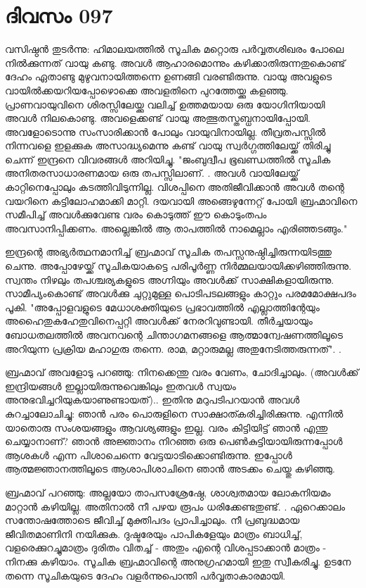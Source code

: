  
\section{ദിവസം 097}


വസിഷ്ഠന്‍ തുടര്‍ന്നു: ഹിമാലയത്തില്‍ സൂചിക മറ്റൊരു പര്‍വ്വതശിഖരം പോലെ നില്‍ക്കുന്നത്‌ വായു കണ്ടു. അവള്‍ ആഹാരമൊന്നും കഴിക്കാതിരുന്നതുകൊണ്ട്‌ ദേഹം ഏതാണ്ടു മുഴുവനായിത്തന്നെ ഉണങ്ങി വരണ്ടിരുന്നു. വായു അവളുടെ വായില്‍ക്കയറിയപ്പോഴൊക്കെ അവളതിനെ പുറത്തേയ്ക്കു കളഞ്ഞു. പ്രാണവായുവിനെ ശിരസ്സിലേയ്ക്കു വലിച്ച്‌ ഉത്തമയായ ഒരു യോഗിനിയായി അവള്‍ നിലകൊണ്ടു. അവളെക്കണ്ട്‌ വായു അത്ഭുതസ്തബ്ധനായിപ്പോയി. അവളോടൊന്നു സംസാരിക്കാന്‍ പോലും വായുവിനായില്ല. തീവ്രതപസ്സില്‍ നിന്നവളെ ഇളക്കുക അസാദ്ധ്യമെന്നു കണ്ട്‌ വായു സ്വര്‍ഗ്ഗത്തിലേയ്ക്ക്‌ തിരിച്ചു ചെന്ന് ഇന്ദ്രനെ വിവരങ്ങള്‍ അറിയിച്ചു. "ജംബുദ്വീപ ഭൂഖണ്ഡത്തില്‍ സൂചിക അനിതരസാധാരണമായ ഒരു തപസ്സിലാണ്‌. . അവള്‍ വായിലേയ്ക്ക്‌ കാറ്റിനെപ്പോലും കടത്തിവിടുന്നില്ല. വിശപ്പിനെ അതിജീവിക്കാന്‍ അവള്‍ തന്റെ വയറിനെ കട്ടിലോഹമാക്കി മാറ്റി. ദയവായി അങ്ങെഴുന്നേറ്റ്‌ പോയി ബ്രഹ്മാവിനെ സമീപിച്ച്‌ അവള്‍ക്കുവേണ്ട വരം കൊടുത്ത്‌ ഈ കൊടുംതപം അവസാനിപ്പിക്കണം. അല്ലെങ്കില്‍ ആ താപത്തില്‍ നാമെല്ലാം എരിഞ്ഞടങ്ങും." 

ഇന്ദ്രന്റെ അഭ്യര്‍ത്ഥനമാനിച്ച്‌ ബ്രഹ്മാവ്‌ സൂചിക തപസ്സനുഷ്ഠിച്ചിരുന്നയിടത്തു ചെന്നു. അപ്പോഴേയ്ക്ക്‌ സൂചികയാകട്ടെ പരിപൂര്‍ണ്ണ നിര്‍മ്മലയായിക്കഴിഞ്ഞിരുന്നു. സ്വന്തം നിഴലും തപശ്ചര്യകളുടെ അഗ്നിയും അവള്‍ക്ക്‌ സാക്ഷികളായിരുന്നു. സാമീപ്യംകൊണ്ട്‌ അവള്‍ക്കു ചുറ്റുമുള്ള പൊടിപടലങ്ങളും കാറ്റും പരമമോക്ഷപദം പൂകി. "അപ്പോളവളുടെ മേധാശക്തിയുടെ പ്രഭാവത്തില്‍ എല്ലാത്തിന്റേയും അഹൈതുകഹേതുവിനെപ്പറ്റി അവള്‍ക്ക്‌ നേരറിവുണ്ടായി. തീര്‍ച്ചയായും ബോധതലത്തില്‍ അവനവന്റെ ചിന്താഗമനങ്ങളെ ആത്മാന്വേഷണത്തിലൂടെ അറിയുന്ന പ്രക്രിയ മഹാഗുരു തന്നെ. രാമ, മറ്റാരുമല്ല അതുനേടിത്തരുന്നത്‌". .

ബ്രഹ്മാവ്‌ അവളോടു പറഞ്ഞു: നിനക്കെന്തു വരം വേണം, ചോദിച്ചാലും. (അവള്‍ക്ക്‌ ഇന്ദ്രിയങ്ങള്‍ ഇല്ലായിരുന്നുവെങ്കിലും ഇതവള്‍ സ്വയം അനുഭവിച്ചറിയുകയാണുണ്ടായത്‌).. ഇതിനു മറുപടിപറയാന്‍ അവള്‍ കുറച്ചാലോചിച്ചു: ഞാന്‍ പരം പൊരുളിനെ സാക്ഷാത്കരിച്ചിരിക്കുന്നു. എന്നില്‍ യാതൊരു സംശയങ്ങളും ആവശ്യങ്ങളും ഇല്ല. വരം കിട്ടിയിട്ട്‌ ഞാന്‍ എന്തു ചെയ്യാനാണ്‌? ഞാന്‍ അജ്ഞാനം നിറഞ്ഞ ഒരു പെണ്‍കുട്ടിയായിരുന്നപ്പോള്‍ ആശകള്‍ എന്ന പിശാചെന്നെ വേട്ടയാടിക്കൊണ്ടിരുന്നു. ഇപ്പോള്‍ ആത്മജ്ഞാനത്തിലൂടെ ആശാപിശാചിനെ ഞാന്‍ അടക്കം ചെയ്തു കഴിഞ്ഞു. 

ബ്രഹ്മാവ്‌ പറഞ്ഞു: അല്ലയോ താപസശ്രേഷ്ഠേ, ശാശ്വതമായ ലോകനിയമം മാറ്റാന്‍ കഴിയില്ല. അതിനാല്‍ നീ പഴയ രൂപം ധരിക്കേണ്ടതുണ്ട്‌. . ഏറെക്കാലം സന്തോഷത്തോടെ ജീവിച്ച്‌ മുക്തിപദം പ്രാപിച്ചാലും. നീ പ്രബുദ്ധമായ ജീവിതമാണിനി നയിക്കുക. ദുഷ്ടരേയും പാപികളേയും മാത്രം ബാധിച്ച്‌, വളരെക്കുറച്ചുമാത്രം ദുരിതം വിതച്ച്‌ - അതും എന്റെ വിശപ്പടാക്കാന്‍ മാത്രം - നിനക്കു കഴിയാം. സൂചിക ബ്രഹ്മാവിന്റെ അനുഗ്രഹമായി ഇതു സ്വീകരിച്ചു. ഉടനേ തന്നെ സൂചികയുടെ ദേഹം വളര്‍ന്നുപൊന്തി പര്‍വ്വതാകാരമായി. 

